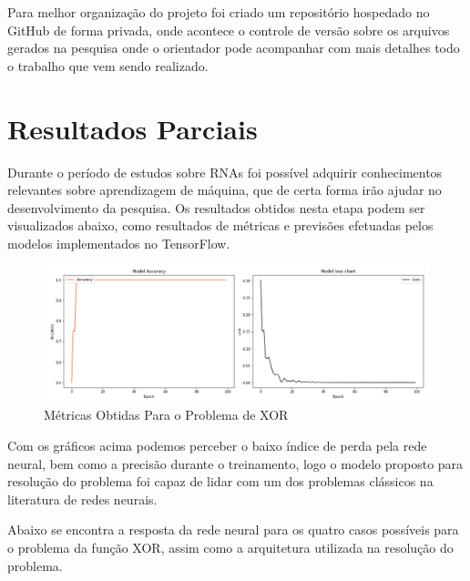 \documentclass[12pt,openright,openany,oneside,article,a4paper,brazi]{abntex2}
\begin{document}
Para melhor organização do projeto foi criado um repositório hospedado no GitHub de forma privada, onde acontece o controle de versão sobre os arquivos gerados na pesquisa
onde o orientador pode acompanhar com mais detalhes todo o trabalho que vem sendo realizado.  
 
\section*{Resultados Parciais}

Durante o período de estudos sobre RNAs foi possível adquirir conhecimentos relevantes sobre aprendizagem de máquina, que de certa forma irão ajudar no desenvolvimento da pesquisa. Os resultados obtidos
nesta etapa podem ser visualizados abaixo, como resultados de métricas e previsões efetuadas pelos modelos implementados no TensorFlow. \\


\begin{figure}[!htb]
  \centering
  \includegraphics[scale=0.6]{metrics_XOR.PNG}
  \caption{Métricas Obtidas Para o Problema de XOR}
  \label{fig:}
\end{figure}

Com os gráficos acima podemos perceber o baixo índice de perda pela rede neural, bem como a precisão durante o treinamento, logo o modelo proposto para resolução do problema 
foi capaz de lidar com um dos problemas clássicos na literatura de redes neurais.

Abaixo se encontra a resposta da rede neural para os quatro casos possíveis para o problema da função XOR, assim como a arquitetura utilizada na resolução do problema. \\ \\ \\ \\ \\
\end{document}
